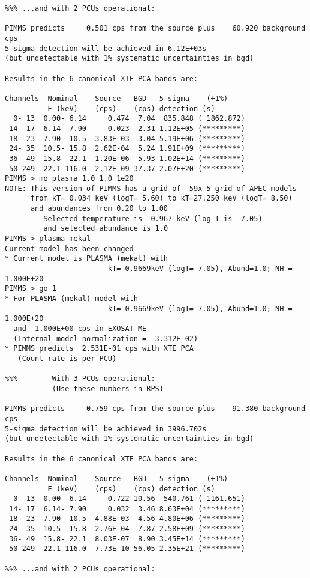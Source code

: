 \documentclass[11pt]{article}
\begin{document}
\begin{verbatim}
%%% ...and with 2 PCUs operational:

PIMMS predicts     0.501 cps from the source plus    60.920 background cps
5-sigma detection will be achieved in 6.12E+03s
(but undetectable with 1% systematic uncertainties in bgd)

Results in the 6 canonical XTE PCA bands are:

Channels  Nominal    Source   BGD   5-sigma    (+1%)
          E (keV)    (cps)    (cps) detection (s)
  0- 13  0.00- 6.14     0.474  7.04  835.848 ( 1862.872)
 14- 17  6.14- 7.90     0.023  2.31 1.12E+05 (*********)
 18- 23  7.90- 10.5  3.83E-03  3.04 5.19E+06 (*********)
 24- 35  10.5- 15.8  2.62E-04  5.24 1.91E+09 (*********)
 36- 49  15.8- 22.1  1.20E-06  5.93 1.02E+14 (*********)
 50-249  22.1-116.0  2.12E-09 37.37 2.07E+20 (*********)
PIMMS > mo plasma 1.0 1.0 1e20
NOTE: This version of PIMMS has a grid of  59x 5 grid of APEC models
      from kT= 0.034 keV (logT= 5.60) to kT=27.250 keV (logT= 8.50)
      and abundances from 0.20 to 1.00
         Selected temperature is  0.967 keV (log T is  7.05)
         and selected abundance is 1.0
PIMMS > plasma mekal
Current model has been changed
* Current model is PLASMA (mekal) with
                        kT= 0.9669keV (logT= 7.05), Abund=1.0; NH =  1.000E+20
PIMMS > go 1
* For PLASMA (mekal) model with
                        kT= 0.9669keV (logT= 7.05), Abund=1.0; NH =  1.000E+20
  and  1.000E+00 cps in EXOSAT ME
  (Internal model normalization =  3.312E-02)
* PIMMS predicts  2.531E-01 cps with XTE PCA
   (Count rate is per PCU)

%%%        With 3 PCUs operational:
           (Use these numbers in RPS)

PIMMS predicts     0.759 cps from the source plus    91.380 background cps
5-sigma detection will be achieved in 3996.702s
(but undetectable with 1% systematic uncertainties in bgd)

Results in the 6 canonical XTE PCA bands are:

Channels  Nominal    Source   BGD   5-sigma    (+1%)
          E (keV)    (cps)    (cps) detection (s)
  0- 13  0.00- 6.14     0.722 10.56  540.761 ( 1161.651)
 14- 17  6.14- 7.90     0.032  3.46 8.63E+04 (*********)
 18- 23  7.90- 10.5  4.88E-03  4.56 4.80E+06 (*********)
 24- 35  10.5- 15.8  2.76E-04  7.87 2.58E+09 (*********)
 36- 49  15.8- 22.1  8.03E-07  8.90 3.45E+14 (*********)
 50-249  22.1-116.0  7.73E-10 56.05 2.35E+21 (*********)

%%% ...and with 2 PCUs operational:


\end{verbatim}
\end{document}

